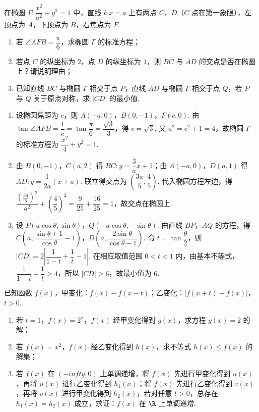 \begin{problem}
在椭圆 \(\Gamma:\dfrac{x^2}{a^2}+y^2=1\) 中，直线 \(l:x=a\) 上有两点 \(C\)，\(D\)（\(C\) 点在第一象限），左顶点为 \(A\)，下顶点为 \(B\)，右焦点为 \(F\).

\begin{enumerate}
\item 若 \(\angle AFB=\dfrac\pi6\)，求椭圆 \(\Gamma\) 的标准方程；
\item 若点 \(C\) 的纵坐标为 \(2\)，点 \(D\) 的纵坐标为 \(1\)，则 \(BC\) 与 \(AD\) 的交点是否在椭圆上？请说明理由；
\item 已知直线 \(BC\) 与椭圆 \(\Gamma\) 相交于点 \(P\)，直线 \(AD\) 与椭圆 \(\Gamma\) 相交于点 \(Q\)，若 \(P\) 与 \(Q\) 关于原点对称，求 \(\lvert CD\rvert\) 的最小值.
\end{enumerate}
\end{problem}

\begin{solution}
\begin{enumerate}
\item 设椭圆焦距为 \(c\)，则 \(A(-a,0)\)，\(B(0,-1)\)，\(F(c,0)\). 由 \(\tan\angle AFB=\dfrac1c=\tan\dfrac\pi6=\dfrac{\sqrt3}{3}\)，得 \(c=\sqrt3\). 又 \(a^2=c^2+1=4\)，故椭圆 \(\Gamma\) 的标准方程为 \(\dfrac{x^2}{4}+y^2=1\).
\item 由 \(B(0,-1)\)，\(C(a,2)\) 得 \(BC:y=\dfrac3a x+1\)；由 \(A(-a,0)\)，\(D(a,1)\) 得 \(AD:y=\dfrac1{2a}(x+a)\). 联立得交点为 \(\left(\dfrac{3a}{5},\dfrac45\right)\). 代入椭圆方程左边，得 \(\dfrac{\left(\frac{3a}{5}\right)^2}{a^2}+\left(\dfrac45\right)^2=\dfrac9{25}+\dfrac{16}{25}=1\)，故交点在椭圆上.
\item 设 \(P(a\cos\theta,\sin\theta)\)，\(Q(-a\cos\theta,-\sin\theta)\). 由直线 \(BP\)，\(AQ\) 的方程，得 \(C\left(a,\dfrac{\sin\theta+1}{\cos\theta}-1\right)\)，\(D\left(a,\dfrac{2\sin\theta}{\cos\theta-1}\right)\). 令 \(t=\tan\dfrac\theta2\)，则
\(\lvert CD\rvert=2\left\lvert\dfrac1{1-t}+\dfrac1t-1\right\rvert\). 在相应取值范围 \(0<t<1\) 内，由基本不等式，\(\dfrac1{1-t}+\dfrac1t\ge4\)，所以 \(\lvert CD\rvert\ge6\)，故最小值为 \(6\).
\end{enumerate}
\end{solution}

\begin{problem}
已知函数 \(f(x)\)，甲变化：\(f(x)-f(x-t)\)；乙变化：\(\lvert f(x+t)-f(x)\rvert\)，\(t>0\).

\begin{enumerate}
\item 若 \(t=1\)，\(f(x)=2^x\)，\(f(x)\) 经甲变化得到 \(g(x)\)，求方程 \(g(x)=2\) 的解；
\item 若 \(f(x)=x^2\)，\(f(x)\) 经乙变化得到 \(h(x)\)，求不等式 \(h(x)\le f(x)\) 的解集；
\item 若 \(f(x)\) 在 \((-infty,0)\) 上单调递增，将 \(f(x)\) 先进行甲变化得到 \(u(x)\)，再将 \(u(x)\) 进行乙变化得到 \(h_1(x)\)；将 \(f(x)\) 先进行乙变化得到 \(v(x)\)，再将 \(v(x)\) 进行甲变化得到 \(h_2(x)\)，若对任意 \(t>0\)，总存在 \(h_1(x)=h_2(x)\) 成立，求证：\(f(x)\) 在 \(\R\) 上单调递增.
\end{enumerate}
\end{problem}

